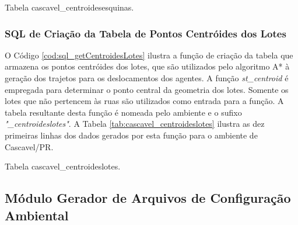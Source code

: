 

\begin{table}[H]
\centering
{}
\caption{Tabela cascavel\_centroidesesquinas.}
\label{tab:cascavel_centroidesesquinas}
\end{table}

\subsubsection{SQL de Criação da Tabela de Pontos Centróides dos Lotes}

O Código \ref{cod:sql_getCentroidesLotes} ilustra a função de criação da tabela que armazena os pontos centróides dos lotes, que são utilizados pelo algoritmo A* à geração dos trajetos para os deslocamentos dos agentes. A função \textit{st\_centroid} é empregada para determinar o ponto central da geometria dos lotes. Somente os lotes que não pertencem às ruas são utilizados como entrada para a função. A tabela resultante desta função é nomeada pelo ambiente e o sufixo \textit{"\_centroideslotes"}. A Tabela \ref{tab:cascavel_centroideslotes} ilustra as dez primeiras linhas dos dados gerados por esta função para o ambiente de Cascavel/PR.



\begin{table}[H]
\centering
{}
\caption{Tabela cascavel\_centroideslotes.}
\label{tab:cascavel_centroideslotes}
\end{table}

\newpage

\subsection{Módulo Gerador de Arquivos de Configuração Ambiental}

